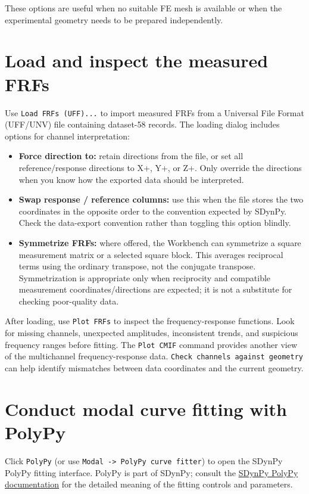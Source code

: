\documentclass[11pt]{article}
\begin{document}
These options are useful when no suitable FE mesh is available or when the experimental geometry needs to be prepared independently.
\section{Load and inspect the measured FRFs}
\label{sec:org8ed5b16}

Use \texttt{Load FRFs (UFF)...} to import measured FRFs from a Universal File Format (UFF/UNV) file containing dataset-58 records. The loading dialog includes options for channel interpretation:

\begin{itemize}
\item \textbf{Force direction to:} retain directions from the file, or set all reference/response directions to X+, Y+, or Z+. Only override the directions when you know how the exported data should be interpreted.
\item \textbf{Swap response / reference columns:} use this when the file stores the two coordinates in the opposite order to the convention expected by SDynPy. Check the data-export convention rather than toggling this option blindly.
\item \textbf{Symmetrize FRFs:} where offered, the Workbench can symmetrize a square measurement matrix or a selected square block. This averages reciprocal terms using the ordinary transpose, not the conjugate transpose. Symmetrization is appropriate only when reciprocity and compatible measurement coordinates/directions are expected; it is not a substitute for checking poor-quality data.
\end{itemize}

After loading, use \texttt{Plot FRFs} to inspect the frequency-response functions. Look for missing channels, unexpected amplitudes, inconsistent trends, and suspicious frequency ranges before fitting. The \texttt{Plot CMIF} command provides another view of the multichannel frequency-response data. \texttt{Check channels against geometry} can help identify mismatches between data coordinates and the current geometry.
\section{Conduct modal curve fitting with PolyPy}
\label{sec:orgbb6382a}

Click \texttt{PolyPy} (or use \texttt{Modal -> PolyPy curve fitter}) to open the SDynPy PolyPy fitting interface. PolyPy is part of SDynPy; consult the \href{https://sandialabs.github.io/sdynpy/sdynpy-polypy-gui/}{SDynPy PolyPy documentation} for the detailed meaning of the fitting controls and parameters.
\end{document}
